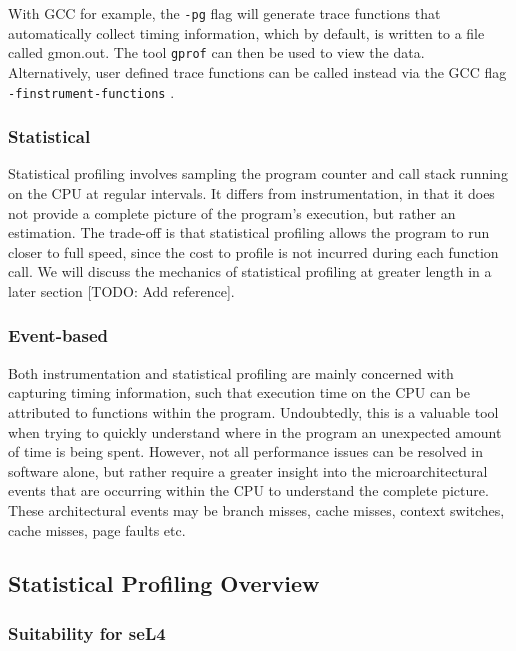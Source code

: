 With GCC for example, the \texttt{-pg} flag will generate trace functions that automatically collect timing information, which by default, is written to a file called gmon.out. The tool \texttt{gprof} can then be used to view the data. Alternatively, user defined trace functions can be called instead via the GCC flag \texttt{-finstrument-functions} \cite{ManGCC}. 

\subsubsection{Statistical}\label{sect:statistical}

Statistical profiling involves sampling the program counter and call stack running on the CPU at regular intervals. It differs from instrumentation, in that it does not provide a complete picture of the program's execution, but rather an estimation. The trade-off is that statistical profiling allows the program to run closer to full speed, since the cost to profile is not incurred during each function call. We will discuss the mechanics of statistical profiling at greater length in a later section [TODO: Add reference].

\subsubsection{Event-based}

Both instrumentation and statistical profiling are mainly concerned with capturing timing information, such that execution time on the CPU can be attributed to functions within the program. Undoubtedly, this is a valuable tool when trying to quickly understand where in the program an unexpected amount of time is being spent. However, not all performance issues can be resolved in software alone, but rather require a greater insight into the microarchitectural events that are occurring within the CPU to understand the complete picture. These architectural events may be branch misses, cache misses, context switches, cache misses, page faults etc. 

\subsection{Statistical Profiling Overview}\label{sect:statistical_profiling}

\subsubsection{Suitability for seL4}

